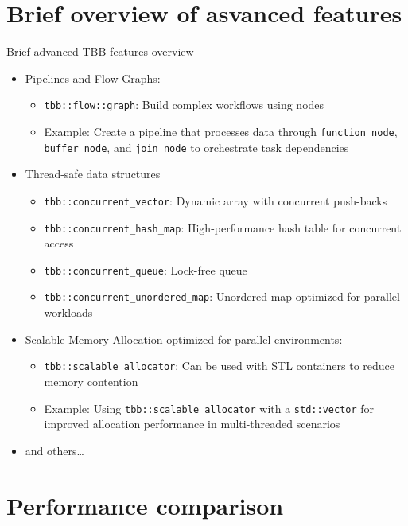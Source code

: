 \documentclass{beamer}
\begin{document}
\section{Brief overview of asvanced features}

\begin{frame}{Brief advanced TBB features overview}
  \begin{itemize}
    \item Pipelines and Flow Graphs:
      \begin{itemize}
        \item \texttt{tbb::flow::graph}: Build complex workflows using nodes
        \item Example: Create a pipeline that processes data through \texttt{function\_node}, \texttt{buffer\_node}, and \texttt{join\_node} to orchestrate task dependencies
      \end{itemize}
    \item Thread-safe data structures
      \begin{itemize}
        \item \texttt{tbb::concurrent\_vector}: Dynamic array with concurrent push-backs
        \item \texttt{tbb::concurrent\_hash\_map}: High-performance hash table for concurrent access
        \item \texttt{tbb::concurrent\_queue}: Lock-free queue
        \item \texttt{tbb::concurrent\_unordered\_map}: Unordered map optimized for parallel workloads
      \end{itemize}
      \item Scalable Memory Allocation optimized for parallel environments:
      \begin{itemize}
        \item \texttt{tbb::scalable\_allocator}: Can be used with STL containers to reduce memory contention
        \item Example: Using \texttt{tbb::scalable\_allocator} with a \texttt{std::vector} for improved allocation performance in multi-threaded scenarios
      \end{itemize}
    \item and others\dots
  \end{itemize}
\end{frame}

\section{Performance comparison}
\end{document}
